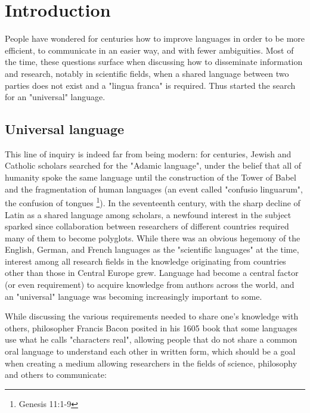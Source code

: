 \chapter{Introduction}

\vspace{0.5cm}

People have wondered for centuries how to improve languages in order to be more efficient, to communicate in an easier way, and with fewer ambiguities.
Most of the time, these questions surface when discussing how to disseminate information and research, notably in scientific fields, when a shared language
between two parties does not exist and a "lingua franca" is required. Thus started the search for an "universal" language.

\section{Universal language}

This line of inquiry is indeed far from being modern: for centuries, Jewish and Catholic scholars searched for the "Adamic language", under the belief that
all of humanity spoke the same language until the construction of the Tower of Babel and the fragmentation of human languages (an event called "confusio linguarum",
the confusion of tongues \footnote{Genesis 11:1-9}). In the seventeenth century, with the sharp decline of Latin as a shared language among scholars, a newfound interest in
the subject sparked since collaboration between researchers of different countries required many of them to become polyglots. While there was an obvious hegemony of the English,
German, and French languages as the "scientific languages" at the time, interest among all research fields in the knowledge originating from countries other than those in Central Europe grew.
Language had become a central factor (or even requirement) to acquire knowledge from authors across the world, and an "universal" language was becoming increasingly important to some.\newline

While discussing the various requirements needed to share one's knowledge with others, philosopher Francis Bacon posited in his 1605 book that some languages use what
he calls "characters real", allowing people that do not share a common oral language to understand each other in written form, which should be a goal when creating a
medium allowing researchers in the fields of science, philosophy and others to communicate:

